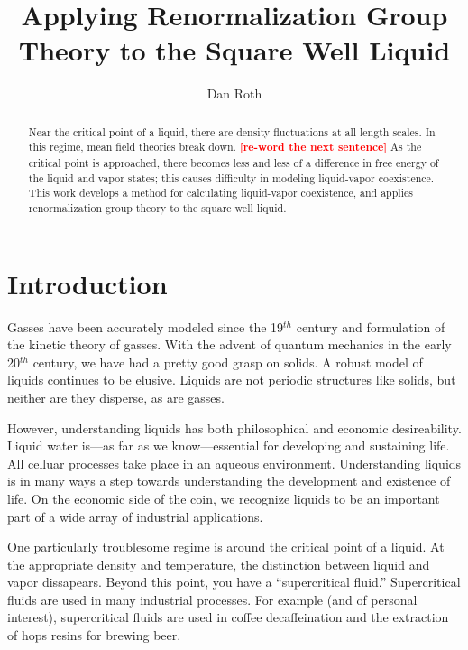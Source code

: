 \documentclass[letterpaper,twocolumn,amsmath,amssymb,prb]{revtex4-1}
\newcommand{\1}{\ensuremath{\textbf{r}_1}}
\newcommand{\2}{\ensuremath{\textbf{r}_2}}
\newcommand{\3}{\ensuremath{\textbf{r}_3}}
\newcommand{\4}{\ensuremath{\textbf{r}_4}}
\newcommand{\fixme}[1]{\textcolor{red}{\textbf{[#1]}}}
\begin{document}
\title{Applying Renormalization Group Theory to the Square Well Liquid}

\author{Dan Roth}

\begin{abstract}

Near the critical point of a liquid, there are density fluctuations at
all length scales. In this regime, mean field theories break down. \fixme{re-word the next sentence} As
the critical point is approached, there becomes less and less of a
difference in free energy of the liquid and vapor states; this causes
difficulty in modeling liquid-vapor coexistence. This work develops a
method for calculating liquid-vapor coexistence, and applies
renormalization group theory to the square well liquid.

\end{abstract}

\maketitle

\section{Introduction}

Gasses have been accurately modeled since the 19$^{th}$
century\cite{Lederman92} and formulation of the kinetic theory of gasses. With the
advent of quantum mechanics in the early 20$^{th}$ century, we have
had a pretty good grasp on solids. A robust model of liquids continues
to be elusive. Liquids are not periodic structures like solids, but
neither are they disperse, as are gasses.

However, understanding liquids has both philosophical and economic
desireability. Liquid water is---as far as we know---essential for
developing and sustaining life. All celluar processes take place in an
aqueous environment. Understanding liquids is in many ways a step
towards understanding the development and existence of life. On the
economic side of the coin, we recognize liquids to be an important
part of a wide array of industrial applications.

One particularly troublesome regime is around the critical
point of a liquid. At the appropriate density and temperature, the
distinction between liquid and vapor dissapears. Beyond this point,
you have a ``supercritical fluid.'' Supercritical fluids are used in
many industrial processes.\cite{Perrut00} For example (and of personal
interest), supercritical fluids are used in coffee decaffeination and
the extraction of hops resins for brewing beer.
\end{document}
